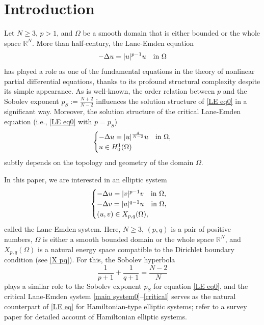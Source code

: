 \documentclass[reqno]{amsart}
\theoremstyle{remark}
\newcommand{\R}{\mathbb{R}}
\renewcommand{\(}{\left(}
\renewcommand{\)}{\right)}
\numberwithin{equation}{section}
\begin{document}
\section{Introduction}%
Let $N \ge 3$, $p > 1$, and $\Omega$ be a smooth domain that is either bounded or the whole space $\R^N$. More than half-century, the Lane-Emden equation
\begin{equation}\label{LE eq0}
-\Delta u = |u|^{p-1}u \quad \textup{in } \Omega
\end{equation}
has played a role as one of the fundamental equations in the theory of nonlinear partial differential equations, thanks to its profound structural complexity despite its simple appearance.
As is well-known, the order relation between $p$ and the Sobolev exponent $p_S := \frac{N+2}{N-2}$ influences the solution structure of \eqref{LE eq0} in a significant way.
Moreover, the solution structure of the critical Lane-Emden equation (i.e., \eqref{LE eq0} with $p = p_S$)
\begin{equation}\label{LE eq}
\begin{cases}
-\Delta u = |u|^{4 \over N-2}u &\textup{in } \Omega,\\
u \in H^1_0(\Omega)
\end{cases}
\end{equation}
subtly depends on the topology and geometry of the domain $\Omega$.

In this paper, we are interested in an elliptic system
\begin{equation}\label{main system0}
\begin{cases}
-\Delta u=|v|^{p-1}v \quad \textup{in } \Omega,\\
-\Delta v=|u|^{q-1}u \quad \textup{in } \Omega,\\
(u,v) \in X_{p,q}(\Omega),
\end{cases}
\end{equation}
called the Lane-Emden system. Here, $N \ge 3$, $(p,q)$ is a pair of positive numbers, $\Omega$ is either a smooth bounded domain or the whole space $\R^N$, and $X_{p,q}(\Omega)$ is a natural energy space compatible to the Dirichlet boundary condition (see \eqref{X pq}).
For this, the Sobolev hyperbola
\begin{equation}\label{critical}
\frac{1}{p+1}+\frac{1}{q+1} = \frac{N-2}{N}
\end{equation}
plays a similar role to the Sobolev exponent $p_S$ for equation \eqref{LE eq0}, and the critical Lane-Emden system \eqref{main system0}--\eqref{critical} serves as the natural counterpart of \eqref{LE eq} for Hamiltonian-type elliptic systems;
refer to a survey paper \cite{BMT} for detailed account of Hamiltonian elliptic systems.
\end{document}
